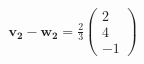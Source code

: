 \documentclass[preview]{standalone}
\begin{document}
\begin{align*}
\mathbf{v_2} - \mathbf{w_2} = \frac{2}{3} \begin{pmatrix} 2 \\ 4 \\ -1 \end{pmatrix}
\end{align*}
\end{document}

